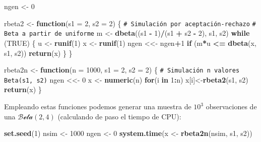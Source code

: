 \documentclass[
  spanish,
  10pt,
]{book}
\newenvironment{Shaded}{\begin{snugshade}}{\end{snugshade}}
\newcommand{\AttributeTok}[1]{\textcolor[rgb]{0.13,0.29,0.53}{#1}}
\newcommand{\CommentTok}[1]{\textcolor[rgb]{0.56,0.35,0.01}{\textit{#1}}}
\newcommand{\ConstantTok}[1]{\textcolor[rgb]{0.56,0.35,0.01}{#1}}
\newcommand{\ControlFlowTok}[1]{\textcolor[rgb]{0.13,0.29,0.53}{\textbf{#1}}}
\newcommand{\DecValTok}[1]{\textcolor[rgb]{0.00,0.00,0.81}{#1}}
\newcommand{\FunctionTok}[1]{\textcolor[rgb]{0.13,0.29,0.53}{\textbf{#1}}}
\newcommand{\NormalTok}[1]{#1}
\newcommand{\OtherTok}[1]{\textcolor[rgb]{0.56,0.35,0.01}{#1}}
\newcommand{\SpecialCharTok}[1]{\textcolor[rgb]{0.81,0.36,0.00}{\textbf{#1}}}
\theoremstyle{break}
\theoremstyle{nonumberplain}
\renewcommand{\CommentTok}[1]{\textcolor[rgb]{0.41,0.41,0.41}{\texttt{#1}}}
\begin{document}
\begin{Shaded}
\begin{Highlighting}[]
\NormalTok{ngen }\OtherTok{\textless{}{-}} \DecValTok{0} 

\NormalTok{rbeta2 }\OtherTok{\textless{}{-}} \ControlFlowTok{function}\NormalTok{(}\AttributeTok{s1 =} \DecValTok{2}\NormalTok{, }\AttributeTok{s2 =} \DecValTok{2}\NormalTok{) \{}
  \CommentTok{\# Simulación por aceptación{-}rechazo}
  \CommentTok{\# Beta a partir de uniforme}
\NormalTok{  m }\OtherTok{\textless{}{-}} \FunctionTok{dbeta}\NormalTok{((s1 }\SpecialCharTok{{-}} \DecValTok{1}\NormalTok{)}\SpecialCharTok{/}\NormalTok{(s1 }\SpecialCharTok{+}\NormalTok{ s2 }\SpecialCharTok{{-}} \DecValTok{2}\NormalTok{), s1, s2)}
  \ControlFlowTok{while}\NormalTok{ (}\ConstantTok{TRUE}\NormalTok{) \{}
\NormalTok{    u }\OtherTok{\textless{}{-}} \FunctionTok{runif}\NormalTok{(}\DecValTok{1}\NormalTok{)}
\NormalTok{    x }\OtherTok{\textless{}{-}} \FunctionTok{runif}\NormalTok{(}\DecValTok{1}\NormalTok{)}
\NormalTok{    ngen }\OtherTok{\textless{}\textless{}{-}}\NormalTok{ ngen}\SpecialCharTok{+}\DecValTok{1}
    \ControlFlowTok{if}\NormalTok{ (m}\SpecialCharTok{*}\NormalTok{u }\SpecialCharTok{\textless{}=} \FunctionTok{dbeta}\NormalTok{(x, s1, s2)) }\FunctionTok{return}\NormalTok{(x)}
\NormalTok{  \}}
\NormalTok{\}}

\NormalTok{rbeta2n }\OtherTok{\textless{}{-}} \ControlFlowTok{function}\NormalTok{(}\AttributeTok{n =} \DecValTok{1000}\NormalTok{, }\AttributeTok{s1 =} \DecValTok{2}\NormalTok{, }\AttributeTok{s2 =} \DecValTok{2}\NormalTok{) \{}
  \CommentTok{\# Simulación n valores Beta(s1, s2)}
\NormalTok{  ngen }\OtherTok{\textless{}\textless{}{-}} \DecValTok{0}
\NormalTok{  x }\OtherTok{\textless{}{-}} \FunctionTok{numeric}\NormalTok{(n)}
  \ControlFlowTok{for}\NormalTok{(i }\ControlFlowTok{in} \DecValTok{1}\SpecialCharTok{:}\NormalTok{n) x[i]}\OtherTok{\textless{}{-}}\FunctionTok{rbeta2}\NormalTok{(s1, s2)}
  \FunctionTok{return}\NormalTok{(x)}
\NormalTok{\}}
\end{Highlighting}
\end{Shaded}

Empleando estas funciones podemos generar una muestra de \(10^3\) observaciones de una \(\mathcal{Beta}(2, 4)\) (calculando de paso el tiempo de CPU):

\begin{Shaded}
\begin{Highlighting}[]
\FunctionTok{set.seed}\NormalTok{(}\DecValTok{1}\NormalTok{)}
\NormalTok{nsim }\OtherTok{\textless{}{-}} \DecValTok{1000}
\NormalTok{ngen }\OtherTok{\textless{}{-}} \DecValTok{0}
\FunctionTok{system.time}\NormalTok{(x }\OtherTok{\textless{}{-}} \FunctionTok{rbeta2n}\NormalTok{(nsim, s1, s2))}
\end{Highlighting}
\end{Shaded}
\end{document}

